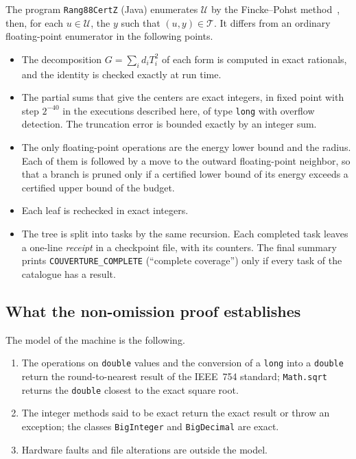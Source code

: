 \documentclass[11pt,a4paper]{amsart}
\theoremstyle{plain}
\theoremstyle{definition}
\numberwithin{equation}{section}
\newcommand{\Uc}{\mathcal{U}}
\newcommand{\Tc}{\mathcal{T}}
\begin{document}
The program \texttt{Rang88CertZ} (Java) enumerates $\Uc$ by the Fincke--Pohst method~\cite{FP85}, then, for each $u\in\Uc$, the $y$ such that $(u,y)\in\Tc$. It differs from an ordinary floating-point enumerator in the following points.
\begin{itemize}
\item The decomposition $G=\sum_id_iT_i^2$ of each form is computed in exact rationals, and the identity is checked exactly at run time.
\item The partial sums that give the centers are exact integers, in fixed point with step $2^{-40}$ in the executions described here, of type \texttt{long} with overflow detection. The truncation error is bounded exactly by an integer sum.
\item The only floating-point operations are the energy lower bound and the radius. Each of them is followed by a move to the outward floating-point neighbor, so that a branch is pruned only if a certified lower bound of its energy exceeds a certified upper bound of the budget.
\item Each leaf is rechecked in exact integers.
\item The tree is split into tasks by the same recursion. Each completed task leaves a one-line \emph{receipt} in a checkpoint file, with its counters. The final summary prints \texttt{COUVERTURE\_COMPLETE} (``complete coverage'') only if every task of the catalogue has a result.
\end{itemize}

\subsection{What the non-omission proof establishes}
The model of the machine is the following.
\begin{enumerate}[label=\textup{(M\arabic*)}]
\item The operations on \texttt{double} values and the conversion of a \texttt{long} into a \texttt{double} return the round-to-nearest result of the IEEE~754 standard; \texttt{Math.sqrt} returns the \texttt{double} closest to the exact square root.
\item The integer methods said to be exact return the exact result or throw an exception; the classes \texttt{BigInteger} and \texttt{BigDecimal} are exact.
\item Hardware faults and file alterations are outside the model.
\end{enumerate}
\end{document}
